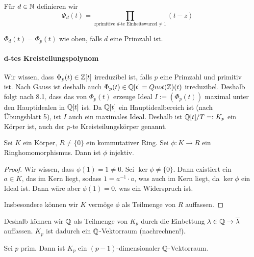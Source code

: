 \documentclass[12pt,a4paper]{scrartcl}
\begin{document}
\begin{defi}
	Für $d \in \mathbb N$ definieren wir 
	\begin{equation*}
		\Phi_d(t) = \prod_{z \text{primitive $d$-te Einheitswurzel} \neq 1} (t - z)
	\end{equation*}
\end{defi}

\begin{bem}
	$\Phi_d(t) = \Phi_p(t)$ wie oben, falls $d$ eine Primzahl ist. 
\end{bem}

\paragraph{d-tes Kreisteilungspolynom}
Wir wissen, dass $\Phi_p(t) \in \mathbb Z[t]$ irreduzibel ist, falls $p$ eine Primzahl und primitiv ist. Nach Gauss ist deshalb auch $\Phi_p(t) \in \mathbb Q[t] = Quot(\mathbb Z)(t)$ irreduzibel. Deshalb folgt nach 8.1, dass das von $\Phi_p(t)$ erzeuge Ideal $I := \left( \Phi_p(t)\right) $ maximal unter den Hauptidealen in $\mathbb Q[t]$ ist. Da $\mathbb Q[t]$ ein Hauptidealbereich ist (nach Übungsblatt 5), ist $I$ auch ein maximales Ideal. Deshalb ist $\mathbb Q[t] / T =: K_p $ ein Körper ist, auch der $p$-te Kreisteilungskörper genannt.

\begin{lem}
	Sei $K$ ein Körper, $R \neq \{0\}$ ein kommutativer Ring. Sei $\phi: K \to R$ ein Ringhomomorphismus. Dann ist $\phi$ injektiv.
\end{lem}

\begin{proof}
	Wir wissen, dass $\phi (1) = 1 \neq 0$. Sei $\ker \phi \neq \{0\}$. Dann existiert ein $a \in K$, das im Kern liegt, sodass $1 = a^{-1}\cdot a$, was auch im Kern liegt, da $\ker \phi$ ein Ideal ist. Dann wäre aber $\phi(1) = 0$, was ein Widerspruch ist.
	
	Insbesondere können wir $K$ vermöge $\phi$ als Teilmenge von $R$ auffassen.  
\end{proof}

Deshalb können wir $\mathbb Q$ als Teilmenge von $K_p$ durch die Einbettung $\lambda \in \mathbb Q \to \overline{\lambda}$ auffassen. $K_p$ ist dadurch ein $\mathbb Q$-Vektorraum (nachrechnen!).

\begin{lem}
	Sei $p$ prim. Dann ist $K_p$ ein $(p-1)$-dimensionaler $\mathbb Q$-Vektorraum.
\end{lem}
\end{document}
